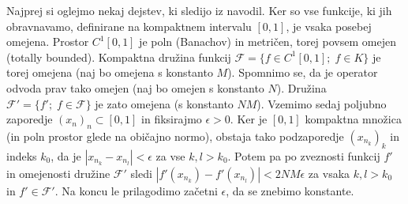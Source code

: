 \documentclass[a4paper, 12pt]{article}
\begin{document}
\begin{enumerate}[label=(\alph*)]
	Najprej si oglejmo nekaj dejstev, ki sledijo iz navodil. Ker so vse funkcije, ki jih obravnavamo, definirane na kompaktnem intervalu $[0, 1]$, je vsaka posebej omejena. Prostor $C^1[0, 1]$ je poln (Banachov) in metričen, torej povsem omejen (totally bounded). Kompaktna družina funkcij $\mathcal{F} = \lbrace f \in C^1[0, 1] ;\; f \in K\rbrace$ je torej omejena (naj bo omejena s konstanto $M$). Spomnimo se, da je operator odvoda prav tako omejen (naj bo omejen s konstanto $N$). Družina $\mathcal{F}' = \lbrace f' ; \; f \in \mathcal{F} \rbrace$ je zato omejena (s konstanto $NM$). Vzemimo sedaj poljubno zaporedje $(x_n)_n \subset [0, 1]$ in fiksirajmo $\epsilon > 0$. Ker je $[0, 1]$ kompaktna množica (in poln prostor glede na običajno normo), obstaja tako podzaporedje $(x_{n_k})_k$ in indeks $k_0$, da je $|x_{n_k} - x_{n_l}| < \epsilon$ za vse $k, l > k_0$. Potem pa po zveznosti funkcij $f'$ in omejenosti družine $\mathcal{F}'$ sledi $|f'(x_{n_k}) - f'(x_{n_l})| < 2 N M \epsilon$ za vsaka $k, l > k_0$ in $f' \in \mathcal{F}'$. Na koncu le prilagodimo začetni $\epsilon$, da se znebimo konstante.
\end{enumerate}
\end{document}
